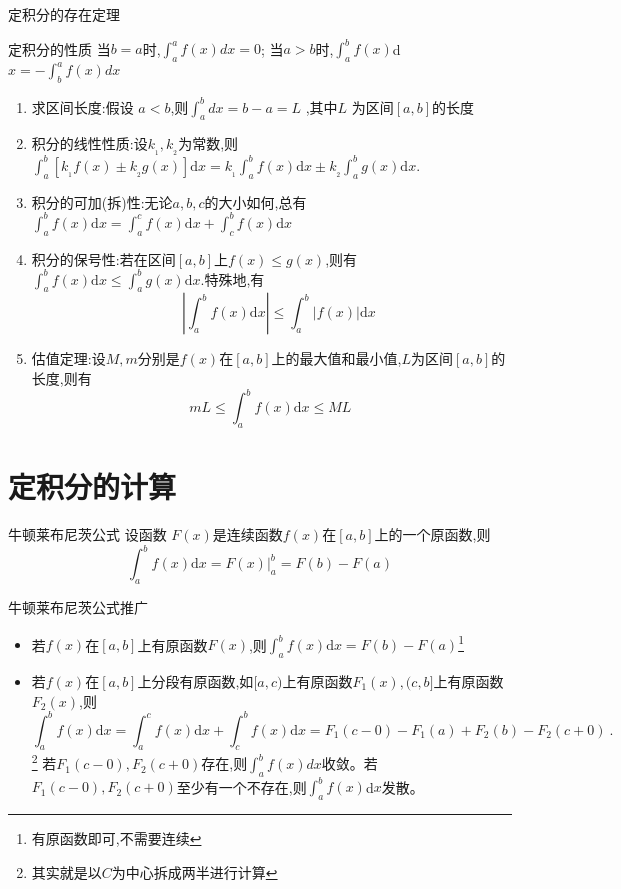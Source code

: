 \documentclass[8pt a4paper, oneside, UTF8]{ctexbook}  %
\begin{document}
\begin{sloppypar}
\begin{them}{定积分的存在定理}{}
\begin{itemize}
\begin{enumerate}
                  \end{enumerate}
        \end{itemize}
    \end{them}
    \begin{criterion}{定积分的性质}{}
        当$b=a$时,$\int_a^af(x)dx=0$;
        当$a>b$时,$\int_a^bf(x)$d$x=-\int_b^af(x)dx$
        \begin{enumerate}
            \item 求区间长度:假设 $a<b$,则$\int _a^b dx=b-a=L$ ,其中$L$ 为区间$[a,b]$的长度
            \item 积分的线性性质:设$k_{_1}, k_{_2}$为常数,则$\int_{a}^{b}[k_{_1}f(x)\pm k_{_2}g(x)]\mathrm{d}x=k_{_1}\int_{a}^{b}f(x)\mathrm{d}x\pm k_{_2}\int_{a}^{b}g(x)\mathrm{d}x$.
            \item 积分的可加(拆)性:无论$a,b,c$的大小如何,总有$\int_a^bf(x)\mathrm{d}x=\int_a^cf(x)\mathrm{d}x+\int_c^bf(x)\mathrm{d}x$
            \item 积分的保号性:若在区间$[a,b]$上$f(x)\leqslant g(x)$,则有$\int_{a}^{b}f(x)\mathrm{d}x\leqslant\int_{a}^{b}g(x)\mathrm{d}x$.特殊地,有$$\quad\left|\int_a^bf(x)\mathrm{d}x\right|\leqslant\int_a^b\left|f(x)\right|\mathrm{d}x$$
            \item 估值定理:设$M,m$分别是$f(x)$在$[a,b]$上的最大值和最小值,$L$为区间$[a,b]$的长度,则有
                  $$mL\leqslant\int_{a}^{b}f(x)\mathrm{d}x\leqslant ML\:$$
        \end{enumerate}
    \end{criterion}
    \section{定积分的计算}
    \begin{defn}{牛顿莱布尼茨公式}{}
        设函数 $F(x)$是连续函数$f(x)$在$[a,b]$上的一个原函数,则
        $$\int_{a}^{b}f(x)\mathrm{d}x=F(x)\Big|_{a}^{b}=F(b)-F(a)$$
    \end{defn}
    \begin{criterion}{牛顿莱布尼茨公式推广}{}
        \begin{itemize}
            \item 若$f(x)$在$\left[a,b\right]$上有原函数$F(x)$,则$\int_{a}^{b}f(x)\mathrm{d}x=F(b)-F(a)$\footnote{有原函数即可,不需要连续}
            \item 若$f(x)$在$[a,b]$上分段有原函数,如$[a,c)$上有原函数$F_1(x),(c,b]$上有原函数$F_2(x)$,则
                  $$\int_{a}^{b}f(x)\mathrm{d}x=\int_{a}^{c}f(x)\mathrm{d}x+\int_{c}^{b}f(x)\mathrm{d}x=F_{1}(c-0)-F_{1}(a)+F_{2}(b)-F_{2}(c+0)\:.$$\footnote{其实就是以$C$为中心拆成两半进行计算}
                  若$F_1(c-0),F_2(c+0)$存在,则$\int_a^bf(x)dx$收敛。若$F_1(c-0),F_{2}(c+0)$至少有一个不存在,则$\int_a^bf(x)$d$x$发散。
        \end{itemize}
    \end{criterion}

\end{sloppypar}
\end{document}
